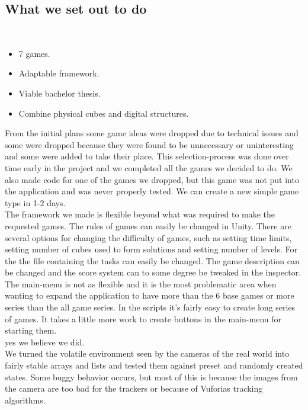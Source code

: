 \subsection{What we set out to do}

\begin{description}
	\item {}

	\item[Result goals]\ 
	\begin{itemize}
		\item 7 games.
		\item Adaptable framework.
		\item Viable bachelor thesis.
		\item Combine physical cubes and digital structures.
	\end{itemize}
	From the initial plans some game ideas were dropped due to technical issues and some were dropped because they were found to be unnecessary or uninteresting and some were added to take their place. 
	This selection-process was done over time early in the project and we completed all the games we decided to do. 
	We also made code for one of the games we dropped, but this game was not put into the application and was never properly tested. 
	We can create a new simple game type in 1-2 days.\\
	The framework we made is flexible beyond what was required to make the requested games. 
	The rules of games can easily be changed in Unity. 
	There are several options for changing the difficulty of games, such as setting time limits, setting number of cubes used to form solutions and setting number of levels. 
	For the \nameref{game:wo0ord_game} the file containing the tasks can easily be changed. 
	The game description can be changed and the score system can to some degree be tweaked in the inspector. 
	The main-menu is not as flexible and it is the most problematic area when wanting to expand the application to have more than the 6 base games or more series than the all game series. 
	In the scripts it's fairly easy to create long series of games. It takes a little more work to create buttons in the main-menu for starting them.\\
	\todo{did we do enough work?}
	yes we believe we did.\\
	We turned the volatile environment seen by the cameras of the real world into fairly stable arrays and lists and tested them against preset and randomly created states. 
	Some buggy behavior occurs, but most of this is because the images from the camera are too bad for the trackers or because of Vuforias tracking algorithms.\\


\end{description}
